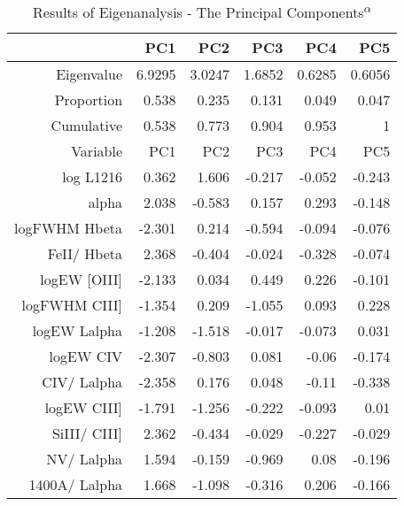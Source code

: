 \begin{table}[h!]
\centering
\caption{Results of Eigenanalysis - The Principal Components\textsuperscript{$\alpha$}}
\begin{tabular}{rrrrrr}
\toprule
{} &     PC1 &     PC2 &     PC3 &     PC4 &     PC5 \\
\midrule
Eigenvalue     &  6.9295 &  3.0247 &  1.6852 &  0.6285 &  0.6056 \\
Proportion     &   0.538 &   0.235 &   0.131 &   0.049 &   0.047 \\
Cumulative     &   0.538 &   0.773 &   0.904 &   0.953 &       1 \\
\midrule
Variable       &     PC1 &     PC2 &     PC3 &     PC4 &     PC5 \\
\midrule
log L1216      &   0.362 &   1.606 &  -0.217 &  -0.052 &  -0.243 \\
alpha          &   2.038 &  -0.583 &   0.157 &   0.293 &  -0.148 \\
logFWHM Hbeta  &  -2.301 &   0.214 &  -0.594 &  -0.094 &  -0.076 \\
FeII/ Hbeta    &   2.368 &  -0.404 &  -0.024 &  -0.328 &  -0.074 \\
logEW [OIII]   &  -2.133 &   0.034 &   0.449 &   0.226 &  -0.101 \\
logFWHM CIII]  &  -1.354 &   0.209 &  -1.055 &   0.093 &   0.228 \\
logEW Lalpha   &  -1.208 &  -1.518 &  -0.017 &  -0.073 &   0.031 \\
logEW CIV      &  -2.307 &  -0.803 &   0.081 &   -0.06 &  -0.174 \\
CIV/ Lalpha    &  -2.358 &   0.176 &   0.048 &   -0.11 &  -0.338 \\
logEW CIII]    &  -1.791 &  -1.256 &  -0.222 &  -0.093 &    0.01 \\
SiIII/ CIII]   &   2.362 &  -0.434 &  -0.029 &  -0.227 &  -0.029 \\
NV/ Lalpha     &   1.594 &  -0.159 &  -0.969 &    0.08 &  -0.196 \\
1400A/ Lalpha  &   1.668 &  -1.098 &  -0.316 &   0.206 &  -0.166 \\
\bottomrule
\end{tabular}
\end{table}